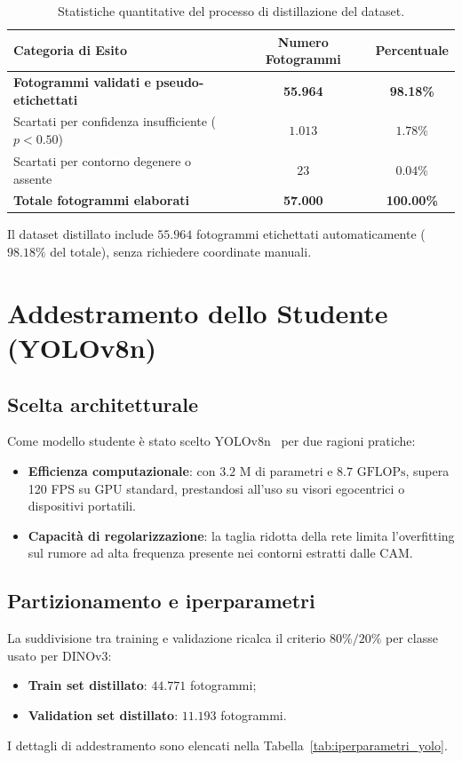 \begin{table}[htbp]
\centering
\small
\begin{tabularx}{\textwidth}{Lcc}
\toprule
\textbf{Categoria di Esito} & \textbf{Numero Fotogrammi} & \textbf{Percentuale} \\
\midrule
\textbf{Fotogrammi validati e pseudo-etichettati} & \textbf{55.964} & \textbf{98.18\%} \\
Scartati per confidenza insufficiente ($p < 0.50$) & $1.013$ & $1.78\%$ \\
Scartati per contorno degenere o assente & $23$ & $0.04\%$ \\
\midrule
\textbf{Totale fotogrammi elaborati} & \textbf{57.000} & \textbf{100.00\%} \\
\bottomrule
\end{tabularx}
\caption{Statistiche quantitative del processo di distillazione del dataset.}
\label{tab:statistiche_distillazione}
\end{table}

Il dataset distillato include $55.964$ fotogrammi etichettati automaticamente ($98.18\%$ del totale), senza richiedere coordinate manuali.

\section{Addestramento dello Studente (YOLOv8n)}
\label{sec:dist_student}

\subsection{Scelta architetturale}
Come modello studente è stato scelto YOLOv8n~\cite{jocher2023ultralytics} per due ragioni pratiche:
\begin{itemize}
    \item \textbf{Efficienza computazionale}: con $3.2\text{ M}$ di parametri e $8.7\text{ GFLOPs}$, supera 120 FPS su GPU standard, prestandosi all'uso su visori egocentrici o dispositivi portatili.
    \item \textbf{Capacità di regolarizzazione}: la taglia ridotta della rete limita l'overfitting sul rumore ad alta frequenza presente nei contorni estratti dalle CAM.
\end{itemize}

\subsection{Partizionamento e iperparametri}
La suddivisione tra training e validazione ricalca il criterio $80\% / 20\%$ per classe usato per DINOv3:
\begin{itemize}
    \item \textbf{Train set distillato}: $44.771$ fotogrammi;
    \item \textbf{Validation set distillato}: $11.193$ fotogrammi.
\end{itemize}
I dettagli di addestramento sono elencati nella Tabella~\ref{tab:iperparametri_yolo}.

